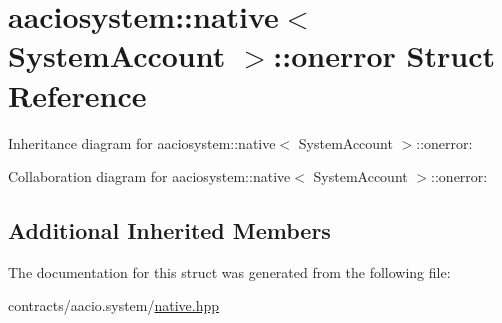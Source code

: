 \hypertarget{structaaciosystem_1_1native_1_1onerror}{}\section{aaciosystem\+:\+:native$<$ System\+Account $>$\+:\+:onerror Struct Reference}
\label{structaaciosystem_1_1native_1_1onerror}


Inheritance diagram for aaciosystem\+:\+:native$<$ System\+Account $>$\+:\+:onerror\+:


Collaboration diagram for aaciosystem\+:\+:native$<$ System\+Account $>$\+:\+:onerror\+:
\subsection*{Additional Inherited Members}


The documentation for this struct was generated from the following file\+:\begin{DoxyCompactItemize}
\item 
contracts/aacio.\+system/\mbox{\hyperlink{native_8hpp}{native.\+hpp}}\end{DoxyCompactItemize}
